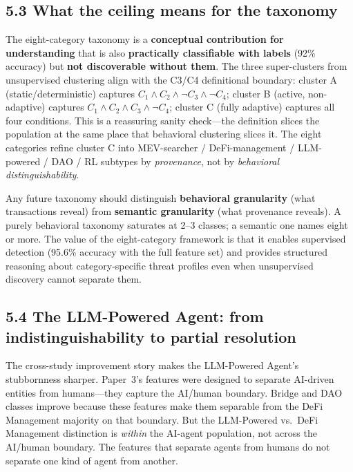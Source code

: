 \documentclass[sigconf,nonacm=false]{acmart}
\begin{document}
\subsection{5.3 What the ceiling means for the taxonomy}

The eight-category taxonomy is a \textbf{conceptual contribution for understanding} that is also \textbf{practically classifiable with labels} (92\% accuracy) but \textbf{not discoverable without them}. The three super-clusters from unsupervised clustering align with the C3/C4 definitional boundary: cluster A (static/deterministic) captures $C_1 \land C_2 \land \lnot C_3 \land \lnot C_4$; cluster B (active, non-adaptive) captures $C_1 \land C_2 \land C_3 \land \lnot C_4$; cluster C (fully adaptive) captures all four conditions. This is a reassuring sanity check---the definition slices the population at the same place that behavioral clustering slices it. The eight categories refine cluster C into MEV-searcher / DeFi-management / LLM-powered / DAO / RL subtypes by \textit{provenance}, not by \textit{behavioral distinguishability}.

Any future taxonomy should distinguish \textbf{behavioral granularity} (what transactions reveal) from \textbf{semantic granularity} (what provenance reveals). A purely behavioral taxonomy saturates at 2--3 classes; a semantic one names eight or more. The value of the eight-category framework is that it enables supervised detection (95.6\% accuracy with the full feature set) and provides structured reasoning about category-specific threat profiles even when unsupervised discovery cannot separate them.

\subsection{5.4 The LLM-Powered Agent: from indistinguishability to partial resolution}

The cross-study improvement story makes the LLM-Powered Agent's stubbornness sharper. Paper~3's features were designed to separate AI-driven entities from humans---they capture the AI/human boundary. Bridge and DAO classes improve because these features make them separable from the DeFi Management majority on that boundary. But the LLM-Powered vs.\ DeFi Management distinction is \emph{within} the AI-agent population, not across the AI/human boundary. The features that separate agents from humans do not separate one kind of agent from another.
\end{document}
